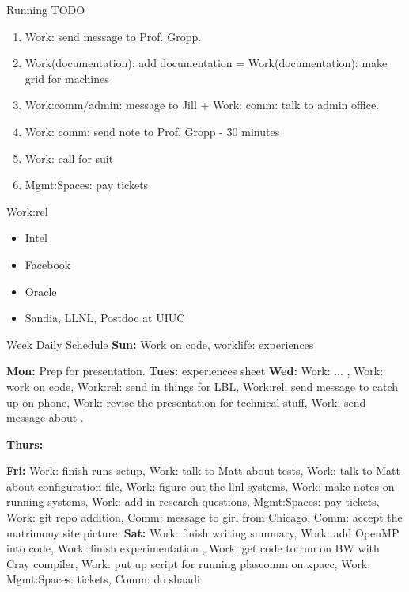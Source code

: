 \begin{frame}
\begin{columns}
\begin{column}{0.50\linewidth}
\begin{block}{Running TODO}
\begin{enumerate}
         

     \item \tiny Work: send message to Prof. Gropp.  

     \item \tiny Work(documentation): add documentation =
       Work(documentation): make grid for machines  

     \item \tiny Work:comm/admin: message to Jill  +  Work: comm: talk
       to admin office. 

     \item \tiny Work: comm: send note to Prof. Gropp - 30 minutes 
       \tiny \item \tiny Work: call for suit  
     \item \tiny Mgmt:Spaces: pay tickets 
        \end{enumerate}
      \end{block} 

      \begin{block}{Work:rel}
        \begin{itemize} 
        \item \tiny Intel 
        \item \tiny Facebook
        \item \tiny Oracle
          \tiny \item \tiny Sandia, LLNL, Postdoc at UIUC  
        \end{itemize}
      \end{block} 

      \begin{block}{Week Daily Schedule} 
        {\small \textbf{Sun:} Work on code, worklife: experiences  }
        {\small \textbf{Mon:} Prep for presentation. \small
          \textbf{Tues:} experiences sheet\small
          \textbf{Wed:} Work: ... , Work: work on code, Work:rel: send
          in things for LBL,  Work:rel: send message to catch up on
          phone, Work: revise the presentation for technical stuff, Work: send
          message about . 

          \small \textbf{Thurs:} 

          \small \textbf{Fri:}  Work: finish runs setup, Work: talk to
          Matt about tests, Work: talk to Matt about configuration
          file, Work: figure out the llnl systems, Work: make notes on
          running systems, Work: add in
          research questions, Mgmt:Spaces: pay tickets, Work: git repo
          addition, Comm: message to girl from Chicago, Comm: accept
          the matrimony site picture. 
          \textbf{Sat:} \small Work: finish writing summary, Work: add
          OpenMP into code, Work: finish experimentation ,  Work: get
          code to run on BW with Cray compiler, 
          Work: put up script for running plascomm on xpacc, Work: 
          Mgmt:Spaces: tickets, Comm: do shaadi  } 


\end{block}
\end{column}
\end{columns}
\end{frame}
